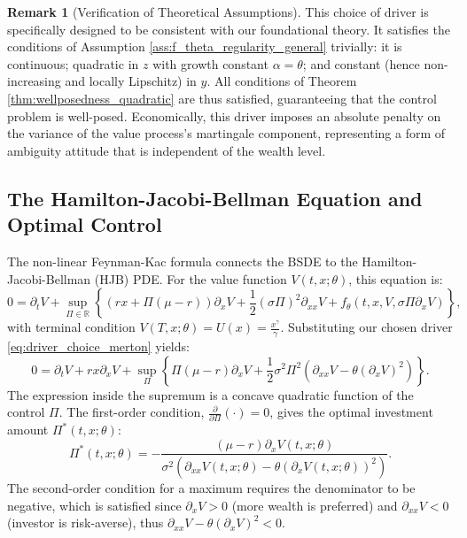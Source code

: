 \documentclass[qian]{imsart}
\newcommand{\R}{\mathbb{R}}
\theoremstyle{plain}
\theoremstyle{definition}
\newtheorem{remark}[theorem]{Remark}
\begin{document}
\begin{remark}[Verification of Theoretical Assumptions]
This choice of driver is specifically designed to be consistent with our foundational theory. It satisfies the conditions of Assumption \ref{ass:f_theta_regularity_general} trivially: it is continuous; quadratic in $z$ with growth constant $\alpha = \theta$; and constant (hence non-increasing and locally Lipschitz) in $y$. All conditions of Theorem \ref{thm:wellposedness_quadratic} are thus satisfied, guaranteeing that the control problem is well-posed. Economically, this driver imposes an absolute penalty on the variance of the value process's martingale component, representing a form of ambiguity attitude that is independent of the wealth level.
\end{remark}

\subsection{The Hamilton-Jacobi-Bellman Equation and Optimal Control}

The non-linear Feynman-Kac formula connects the BSDE to the Hamilton-Jacobi-Bellman (HJB) PDE. For the value function $V(t,x; \theta)$, this equation is:
\begin{equation}
\label{eq:hjb_general_merton}
0 = \partial_t V + \sup_{\Pi \in \R} \left\{ (rx + \Pi(\mu-r))\partial_x V + \frac{1}{2}(\sigma \Pi)^2 \partial_{xx}V + f_\theta(t, x, V, \sigma \Pi \partial_x V) \right\},
\end{equation}
with terminal condition $V(T,x; \theta) = U(x) = \frac{x^\gamma}{\gamma}$. Substituting our chosen driver \eqref{eq:driver_choice_merton} yields:
\begin{equation}
\label{eq:hjb_specific_merton}
0 = \partial_t V + rx \partial_x V + \sup_{\Pi} \left\{ \Pi(\mu-r)\partial_x V + \frac{1}{2}\sigma^2 \Pi^2 \left( \partial_{xx}V - \theta(\partial_xV)^2 \right) \right\}.
\end{equation}
The expression inside the supremum is a concave quadratic function of the control $\Pi$. The first-order condition, $\frac{\partial}{\partial \Pi}(\cdot) = 0$, gives the optimal investment amount $\Pi^*(t,x; \theta)$:
\begin{equation}
\label{eq:merton_pi_general_derived}
\Pi^*(t,x; \theta) = - \frac{(\mu-r)\partial_x V(t,x; \theta)}{\sigma^2 \left(\partial_{xx}V(t,x; \theta) - \theta(\partial_xV(t,x; \theta))^2\right)}.
\end{equation}
The second-order condition for a maximum requires the denominator to be negative, which is satisfied since $\partial_x V > 0$ (more wealth is preferred) and $\partial_{xx}V < 0$ (investor is risk-averse), thus $\partial_{xx}V - \theta(\partial_xV)^2 < 0$.
\end{document}
